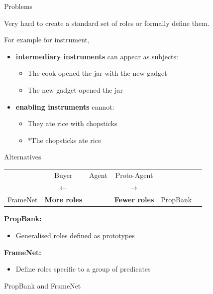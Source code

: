 \documentclass[10pt, compress]{beamer}
\begin{document}
\begin{frame}{Problems}

Very hard to create a standard set of roles or formally define them.

For example for {\sc instrument},
\begin{itemize}
\item \textbf{intermediary instruments} can appear as subjects:
  \begin{itemize}
     \item The cook opened the jar with the new gadget
     \item The new gadget opened the jar
  \end{itemize}
\item \textbf{enabling instruments} cannot:
  \begin{itemize}
    \item They ate rice with chopsticks
    \item *The chopsticks ate rice
  \end{itemize}
\end{itemize}
  
\end{frame}

\begin{frame}{Alternatives}

\begin{center}
\begin{tabular}{cccccc}
              & {\Large Buyer}        &  {\Large Agent} & {\Large Proto-Agent}      &   \\
              & $ {\Large \leftarrow}$ &                 & $ {\Large \rightarrow} $  &  \\
FrameNet      & \textbf{More roles} &                  &  \textbf{Fewer roles}   & PropBank
\end{tabular}
\end{center}

\textbf{PropBank:}
\begin{itemize}
  \item Generalised roles defined as prototypes
\end{itemize}

\textbf{FrameNet:}
\begin{itemize}
  \item Define roles specific to a group of predicates
\end{itemize}

\end{frame}

\begin{frame}[standout]
  PropBank and FrameNet
\end{frame}
\end{document}

